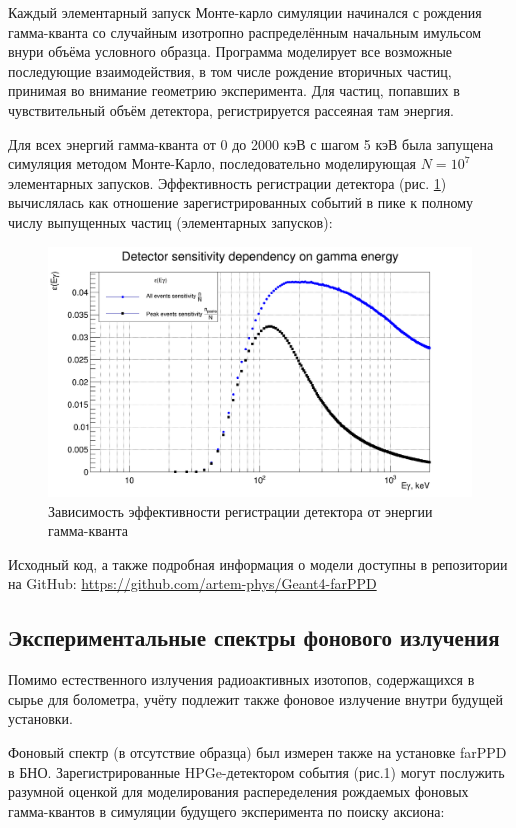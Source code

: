 \documentclass[a4paper,article,14pt]{extarticle}
\begin{document}
Каждый элементарный запуск Монте-карло симуляции начинался с рождения гамма-кванта со случайным изотропно распределённым начальным имульсом внури объёма условного образца. Программа моделирует все возможные последующие взаимодействия, в том числе рождение вторичных частиц, принимая во внимание геометрию эксперимента. Для частиц, попавших в чувствительный объём детектора, регистрируется рассеяная там энергия.

Для всех энергий гамма-кванта от 0 до 2000 кэВ с шагом 5 кэВ была запущена симуляция методом Монте-Карло, последовательно моделирующая $N = 10^7$ элементарных запусков. Эффективность регистрации детектора (рис. \ref{Ey}) вычислялась как отношение зарегистрированных событий в пике к полному числу выпущенных частиц (элементарных запусков):

\begin{figure}[h]
    \centering
    \includegraphics[width = 0.85 \textwidth]{images/DetSens.png}
    \caption{Зависимость эффективности регистрации детектора от энергии гамма-кванта}
    \label{Ey}
\end{figure}

Исходный код, а также подробная информация о модели доступны в репозитории на GitHub: \hyperlink{https://github.com/artem-phys/Geant4-farPPD}{https://github.com/artem-phys/Geant4-farPPD}

    
\subsection{Экспериментальные спектры фонового излучения}
    Помимо естественного излучения радиоактивных изотопов, содержащихся в сырье для болометра, учёту подлежит также фоновое излучение внутри будущей установки.
    
    Фоновый спектр (в отсутствие образца) был измерен также на установке farPPD в БНО. Зарегистрированные HPGe-детектором события (рис.1) могут послужить разумной оценкой для моделирования распеределения рождаемых фоновых гамма-квантов в симуляции будущего эксперимента по поиску аксиона:
    
\end{document}
